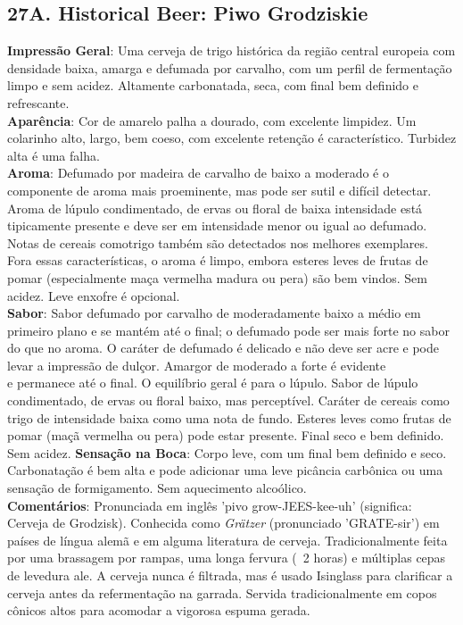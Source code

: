 \subsection*{27A. Historical Beer: Piwo Grodziskie}
\textbf{Impressão Geral}: Uma cerveja de trigo histórica da região central europeia com densidade baixa, amarga e defumada por carvalho, com um perfil de fermentação limpo e sem acidez. Altamente carbonatada, seca, com final bem definido e refrescante. \\
\textbf{Aparência}: Cor de amarelo palha a dourado, com excelente limpidez. Um colarinho alto, largo, bem coeso, com excelente retenção é característico. Turbidez alta é uma falha. \\
\textbf{Aroma}: Defumado por madeira de carvalho de baixo a moderado é o componente de aroma mais proeminente, mas pode ser sutil e difícil detectar. Aroma de lúpulo condimentado, de ervas ou floral de baixa intensidade está tipicamente presente e deve ser em intensidade menor ou igual ao defumado. Notas de cereais comotrigo também são detectados nos melhores exemplares. Fora essas características, o aroma é limpo, embora esteres leves de frutas de pomar (especialmente maça vermelha madura ou pera) são bem vindos. Sem acidez. Leve enxofre é opcional. \\
\textbf{Sabor}: Sabor defumado por carvalho de moderadamente baixo a médio em primeiro plano e se mantém até o final; o defumado pode ser mais forte no sabor do que no aroma. O caráter de defumado é delicado e não deve ser acre e pode levar a impressão de dulçor. Amargor de moderado a forte é evidente \\
e permanece até o final. O equilíbrio geral é para o lúpulo. Sabor de lúpulo condimentado, de ervas ou floral baixo, mas perceptível. Caráter de cereais como trigo de intensidade baixa como uma nota de fundo. Esteres leves como frutas de pomar (maçã vermelha ou pera) pode estar presente. Final seco e bem definido. Sem acidez.
\textbf{Sensação na Boca}: Corpo leve, com um final bem definido e seco. Carbonatação é bem alta e pode adicionar uma leve picância carbônica ou uma sensação de formigamento. Sem aquecimento alcoólico. \\
\textbf{Comentários}: Pronunciada em inglês 'pivo grow-JEES-kee-uh' (significa: Cerveja de Grodzisk). Conhecida como \textit{Grätzer} (pronunciado 'GRATE-sir') em países de língua alemã e em alguma literatura de cerveja. Tradicionalmente feita por uma brassagem por rampas, uma longa fervura (~2 horas) e múltiplas cepas de levedura ale. A cerveja nunca é filtrada, mas é usado Isinglass para clarificar a cerveja antes da refermentação na garrada. Servida tradicionalmente em copos cônicos altos para acomodar a vigorosa espuma gerada. \\
